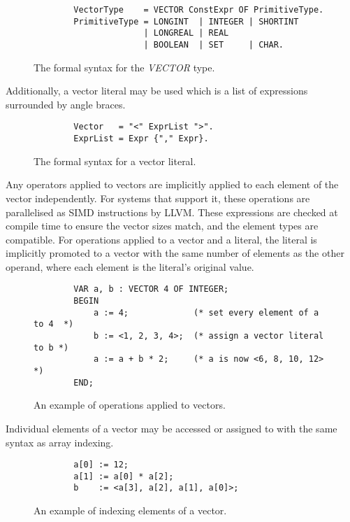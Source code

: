 \documentclass[a4paper,11pt]{article}
\begin{document}
    \begin{figure}[!htbp]
    \begin{lstlisting}
        VectorType    = VECTOR ConstExpr OF PrimitiveType.
        PrimitiveType = LONGINT  | INTEGER | SHORTINT
                      | LONGREAL | REAL 
                      | BOOLEAN  | SET     | CHAR.
    \end{lstlisting}
    \caption{The formal syntax for the \emph{VECTOR} type.}
    \end{figure}

    \noindent
    Additionally, a vector literal may be used which is a list of expressions surrounded by angle braces.
    
    \begin{figure}[!htbp]
    \begin{lstlisting}
        Vector   = "<" ExprList ">".
        ExprList = Expr {"," Expr}.
    \end{lstlisting}
    \caption{The formal syntax for a vector literal.}
    \end{figure}

    \noindent
    Any operators applied to vectors are implicitly applied to each element of the vector independently. For systems that support it, these operations are parallelised as SIMD instructions by LLVM. These expressions are checked at compile time to ensure the vector sizes match, and the element types are compatible. For operations applied to a vector and a literal, the literal is implicitly promoted to a vector with the same number of elements as the other operand, where each element is the literal's original value.

    \begin{figure}[!htbp]
    \begin{lstlisting}
        VAR a, b : VECTOR 4 OF INTEGER;
        BEGIN
            a := 4;             (* set every element of a to 4  *)
            b := <1, 2, 3, 4>;  (* assign a vector literal to b *)
            a := a + b * 2;     (* a is now <6, 8, 10, 12>      *)
        END;
    \end{lstlisting}
    \caption{An example of operations applied to vectors.}
    \end{figure}

    \noindent
    Individual elements of a vector may be accessed or assigned to with the same syntax as array indexing.

    \begin{figure}[!htbp]
    \begin{lstlisting}
        a[0] := 12;
        a[1] := a[0] * a[2];
        b    := <a[3], a[2], a[1], a[0]>;
    \end{lstlisting}
    \caption{An example of indexing elements of a vector.}
    \end{figure}
\end{document}
